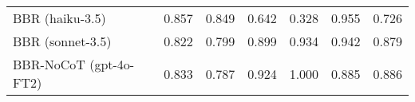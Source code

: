 \begin{table}[htbp]
\begin{tabular}{lcccccc}
BBR (haiku-3.5) & \cellcolor{green!25}0.857 & \cellcolor{green!25}0.849 & \cellcolor{green!19}0.642 & \cellcolor{green!9}0.328 & \cellcolor{green!28}0.955 & \cellcolor{green!21}0.726 \\
BBR (sonnet-3.5) & \cellcolor{green!24}0.822 & \cellcolor{green!23}0.799 & \cellcolor{green!26}0.899 & \cellcolor{green!28}0.934 & \cellcolor{green!28}0.942 & \cellcolor{green!26}0.879 \\
BBR-NoCoT (gpt-4o-FT2) & \cellcolor{green!24}0.833 & \cellcolor{green!23}0.787 & \cellcolor{green!27}0.924 & \cellcolor{green!30}1.000 & \cellcolor{green!26}0.885 & \cellcolor{green!26}0.886 \\
\bottomrule
\end{tabular}
\end{table}